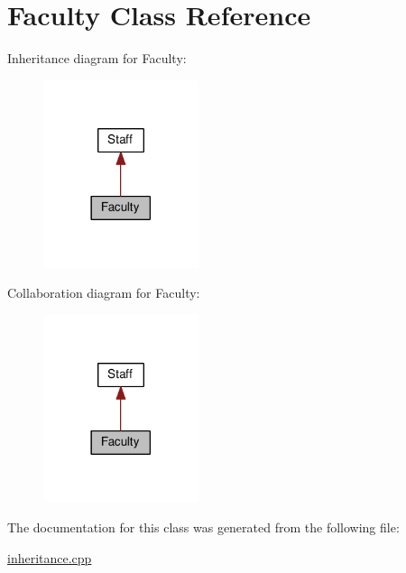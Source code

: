 \hypertarget{class_faculty}{}\section{Faculty Class Reference}
\label{class_faculty}


Inheritance diagram for Faculty\+:
\nopagebreak
\begin{figure}[H]
\begin{center}
\leavevmode
\includegraphics[width=129pt]{class_faculty__inherit__graph}
\end{center}
\end{figure}


Collaboration diagram for Faculty\+:
\nopagebreak
\begin{figure}[H]
\begin{center}
\leavevmode
\includegraphics[width=129pt]{class_faculty__coll__graph}
\end{center}
\end{figure}


The documentation for this class was generated from the following file\+:\begin{DoxyCompactItemize}
\item 
\hyperlink{inheritance_8cpp}{inheritance.\+cpp}\end{DoxyCompactItemize}
